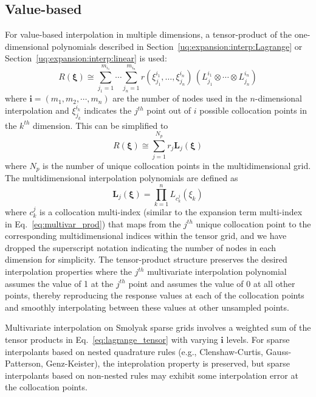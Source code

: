 \subsection{Value-based} \label{uq:expansion:sc:value}

For value-based interpolation in multiple dimensions, a tensor-product
of the one-dimensional polynomials described in
Section~\ref{uq:expansion:interp:Lagrange} or
Section~\ref{uq:expansion:interp:linear} is used:
\begin{equation}
R(\boldsymbol{\xi}) \cong \sum_{j_1=1}^{m_{i_1}}\cdots\sum_{j_n=1}^{m_{i_n}}
r\left(\xi^{i_1}_{j_1},\dots , \xi^{i_n}_{j_n}\right)\,
\left(L^{i_1}_{j_1}\otimes\cdots\otimes L^{i_n}_{j_n}\right)
\label{eq:lagrange_tensor}
\end{equation}
where $\boldsymbol{i} = (m_1, m_2, \cdots, m_n)$ are the number of
nodes used in the $n$-dimensional interpolation and $\xi_{j_k}^{i_k}$ 
indicates the $j^{th}$ point out of $i$ possible collocation points 
in the $k^{th}$ dimension.  This can be simplified to
\begin{equation}
R(\boldsymbol{\xi}) \cong \sum_{j=1}^{N_p} r_j \boldsymbol{L}_j(\boldsymbol{\xi})
\label{eq:lagrange_interp_nd}
\end{equation}
where $N_p$ is the number of unique collocation points in the
multidimensional grid.  The multidimensional interpolation polynomials
are defined as
\begin{equation}
\boldsymbol{L}_j(\boldsymbol{\xi}) = \prod_{k=1}^{n} L_{c_k^j}(\xi_k) 
\label{eq:multivar_L}
\end{equation}
where $c_k^j$ is a collocation multi-index (similar to the expansion
term multi-index in Eq.~\ref{eq:multivar_prod}) that maps from the
$j^{th}$ unique collocation point to the corresponding
multidimensional indices within the tensor grid, and we have dropped
the superscript notation indicating the number of nodes in each
dimension for simplicity.  The tensor-product structure preserves the
desired interpolation properties where the $j^{th}$ multivariate
interpolation polynomial assumes the value of 1 at the $j^{th}$ point
and assumes the value of 0 at all other points, thereby reproducing
the response values at each of the collocation points and smoothly
interpolating between these values at other unsampled points.

Multivariate interpolation on Smolyak sparse grids involves a weighted
sum of the tensor products in Eq.~\ref{eq:lagrange_tensor} with
varying $\boldsymbol{i}$ levels.  For sparse interpolants based on
nested quadrature rules (e.g., Clenshaw-Curtis, Gauss-Patterson,
Genz-Keister), the inteprolation property is preserved, but sparse
interpolants based on non-nested rules may exhibit some interpolation
error at the collocation points.

